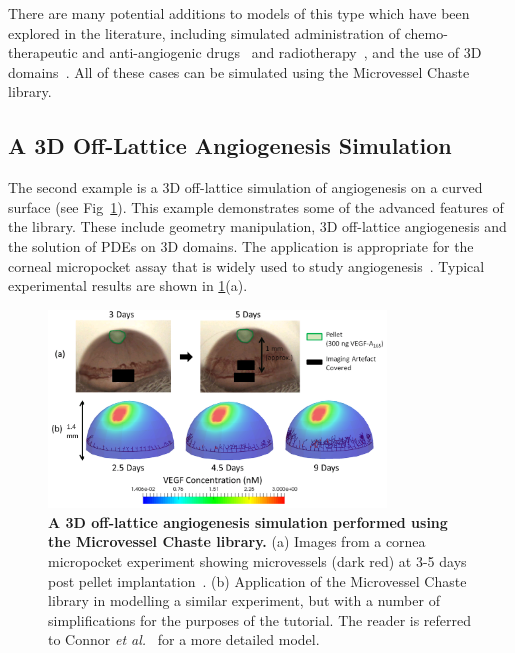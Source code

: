 \documentclass[10pt,letterpaper]{article}
\begin{document}
There are many potential additions to models of this type which have been explored in the literature, including simulated administration of chemo-therapeutic and anti-angiogenic drugs~\cite{Alarcon2006} and radiotherapy~\cite{Grogan2016}, and the use of 3D domains~\cite{Perfahl2011}. All of these cases can be simulated using the Microvessel Chaste library.

\subsection*{A 3D Off-Lattice Angiogenesis Simulation}

The second example is a 3D off-lattice simulation of angiogenesis on a curved surface (see Fig~\ref{fig4}). This example demonstrates some of the advanced features of the library. These include geometry manipulation, 3D off-lattice angiogenesis and the solution of PDEs on 3D domains. The application is appropriate for the corneal micropocket assay that is widely used to study angiogenesis~\cite{Connor2015}. Typical experimental results are shown in \ref{fig4}(a). 

\begin{figure}[!h]
\centering
\includegraphics[width=0.8\textwidth]{Fig4.png}
\caption{{\bf A 3D off-lattice angiogenesis simulation performed using the Microvessel Chaste library.}
(a) Images from a cornea micropocket experiment showing microvessels (dark red) at 3-5 days post pellet implantation~\cite{Connor2015}. (b) Application of the Microvessel Chaste library in modelling a similar experiment, but with a number of simplifications for the purposes of the tutorial. The reader is referred to Connor \emph{et al.}~\cite{Connor2015} for a more detailed model.}
\label{fig4}
\end{figure}
\end{document}
